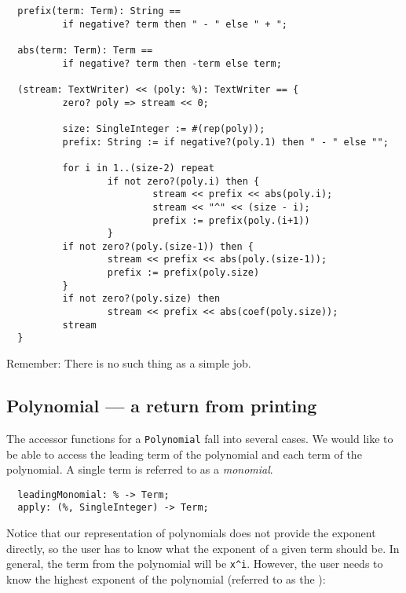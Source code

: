 \begin{small}
\begin{verbatim}
  prefix(term: Term): String ==
          if negative? term then " - " else " + ";

  abs(term: Term): Term ==
          if negative? term then -term else term;

  (stream: TextWriter) << (poly: %): TextWriter == {
          zero? poly => stream << 0;

          size: SingleInteger := #(rep(poly));
          prefix: String := if negative?(poly.1) then " - " else "";

          for i in 1..(size-2) repeat
                  if not zero?(poly.i) then {
                          stream << prefix << abs(poly.i);
                          stream << "^" << (size - i);
                          prefix := prefix(poly.(i+1))
                  }
          if not zero?(poly.(size-1)) then {
                  stream << prefix << abs(poly.(size-1));
                  prefix := prefix(poly.size)
          }
          if not zero?(poly.size) then 
                  stream << prefix << abs(coef(poly.size));
          stream
  }
\end{verbatim}
\end{small}

Remember: There is no such thing as a simple job.

\subsection{Polynomial --- a return from printing}

The accessor functions for a \verb"Polynomial" fall into several cases.
We would
like to be able to access the leading term of the polynomial and each
term of the polynomial. A single term is referred to as a
{\em monomial}.

\begin{small}
\begin{verbatim}
  leadingMonomial: % -> Term;
  apply: (%, SingleInteger) -> Term;
\end{verbatim}
\end{small}
  
Notice that our representation of polynomials does not provide the
exponent directly, so the user has to know what the exponent of a given
term should be. In general, the  term from the polynomial will be
\verb+x^i+. However, the user needs to know the highest exponent of
the polynomial (referred to as the ):

